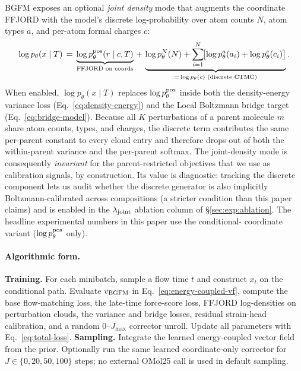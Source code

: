 \documentclass{article}
\begin{document}
BGFM exposes an optional \emph{joint density} mode that augments the
coordinate FFJORD with the model's discrete log-probability over atom
counts $N$, atom types $a$, and per-atom formal charges $c$:
\begin{equation}
    \log p_\theta(x \mid T)
    \,=\,
    \underbrace{\log p_\theta^{\rm pos}(r \mid c, T)}_{\text{FFJORD on coords}}
    \,+\,
    \underbrace{\log p_\theta^N(N) + \sum_{i=1}^{N}\!\bigl[\log p_\theta^a(a_i) + \log p_\theta^c(c_i)\bigr]}_{=\,\log p_\theta(c) \text{ (discrete CTMC)}}.
    \label{eq:joint-density}
\end{equation}
When enabled, $\log p_\theta(x \mid T)$ replaces $\log p_\theta^{\rm pos}$
inside both the density-energy variance loss
(Eq.~\eqref{eq:density-energy}) and the Local Boltzmann bridge target
(Eq.~\eqref{eq:bridge-model}). Because all $K$ perturbations of a parent
molecule $m$ share atom counts, types, and charges, the discrete term
contributes the same per-parent constant to every cloud entry and
therefore drops out of both the within-parent variance and the
per-parent softmax. The joint-density mode is consequently
\emph{invariant} for the parent-restricted objectives that we use as
calibration signals, by construction. Its value is diagnostic: tracking
the discrete component lets us audit whether the discrete generator is
also implicitly Boltzmann-calibrated across compositions (a stricter
condition than this paper claims) and is enabled in the
$\lambda_{\rm joint}$ ablation column of \S\ref{sec:exp:ablation}. The
headline experimental numbers in this paper use the conditional-
coordinate variant ($\log p_\theta^{\rm pos}$ only).


\paragraph{Algorithmic form.}
\textbf{Training.} For each minibatch, sample a flow time $t$ and construct
$x_t$ on the conditional path.  Evaluate $v_{\rm BGFM}$ in
Eq.~\eqref{eq:energy-coupled-vf}, compute the base flow-matching loss, the
late-time force-score loss, FFJORD log-densities on perturbation clouds, the
variance and bridge losses, residual strain-head calibration, and a random
$0$--$J_{\max}$ corrector unroll.  Update all parameters with
Eq.~\eqref{eq:total-loss}.  \textbf{Sampling.} Integrate the learned
energy-coupled vector field from the prior.  Optionally run the same learned
coordinate-only corrector for $J\in\{0,20,50,100\}$ steps; no external OMol25
call is used in default sampling.
\end{document}
